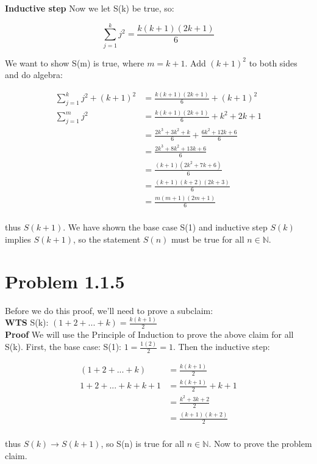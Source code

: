 \documentclass[10pt]{article} %
\begin{document}
\textbf{Inductive step}
Now we let S(k) be true, so:

\begin{equation*}
  \sum_{j=1}^{k} j^2 = \frac{k(k+1)(2k+1)}{6}
\end{equation*}

We want to show S(m) is true, where $m=k+1$. Add $(k+1)^2$ to both sides and do algebra:

\begin{align*}
  \sum_{j=1}^{k} j^2 + (k+1)^2 &= \frac{k(k+1)(2k+1)}{6} + (k+1)^2\\
  \sum_{j=1}^{m} j^2 &= \frac{k(k+1)(2k+1)}{6} + k^2 + 2k + 1\\
  &= \frac{2k^3+3k^2+k}{6} + \frac{6k^2 + 12k + 6}{6}\\
  &= \frac{2k^3+8k^2+13k+6}{6}\\
  &= \frac{(k+1)(2k^2+7k+6)}{6}\\
  &= \frac{(k+1)(k+2)(2k+3)}{6}\\
  &= \frac{m(m+1)(2m+1)}{6}\\
\end{align*}

thus $S(k+1)$. We have shown the base case S(1) and inductive step $S(k)$ implies $S(k+1)$, so the statement $S(n)$ must be true for all $n\in \mathbb{N}$.\\

\section{Problem 1.1.5}
Before we do this proof, we'll need to prove a subclaim:\\
\textbf{WTS} S(k): $(1 + 2 + ... + k) = \frac{k(k+1)}{2}$\\

\textbf{Proof} We will use the Principle of Induction to prove the above claim for all S(k). First, the base case: S(1): $1 = \frac{1(2)}{2} = 1$. Then the inductive step:

\begin{align*}
  (1 + 2 + ... + k) &= \frac{k(k+1)}{2}\\
  1 + 2 + ... + k + k + 1 &= \frac{k(k+1)}{2} + k + 1\\
  &= \frac{k^2 + 3k + 2}{2}\\
  &= \frac{(k+1)(k+2)}{2}\\
\end{align*}

thus $S(k) \rightarrow S(k+1)$, so S(n) is true for all $n \in \mathbb{N}$. Now to prove the problem claim.\\
\end{document}
